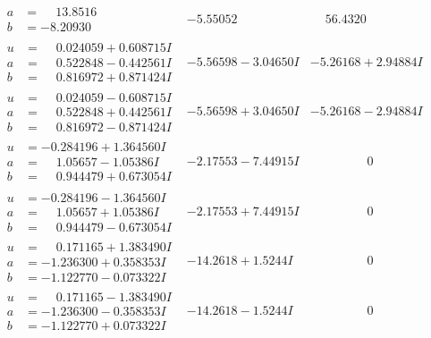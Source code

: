 \documentclass[1p]{elsarticle_modified}
\theoremstyle{definition}
\begin{document}
$$\begin{array}{c|c|c}
\begin{aligned}
a &= \phantom{-}13.8516\phantom{ +0.000000I} \\
b &= -8.20930\phantom{ +0.000000I}\end{aligned}
 & -5.55052\phantom{ +0.000000I} & \phantom{-}56.4320\phantom{ +0.000000I} \\ \hline\begin{aligned}
u &= \phantom{-}0.024059 + 0.608715 I \\
a &= \phantom{-}0.522848 - 0.442561 I \\
b &= \phantom{-}0.816972 + 0.871424 I\end{aligned}
 & -5.56598 - 3.04650 I & -5.26168 + 2.94884 I \\ \hline\begin{aligned}
u &= \phantom{-}0.024059 - 0.608715 I \\
a &= \phantom{-}0.522848 + 0.442561 I \\
b &= \phantom{-}0.816972 - 0.871424 I\end{aligned}
 & -5.56598 + 3.04650 I & -5.26168 - 2.94884 I \\ \hline\begin{aligned}
u &= -0.284196 + 1.364560 I \\
a &= \phantom{-}1.05657 - 1.05386 I \\
b &= \phantom{-}0.944479 + 0.673054 I\end{aligned}
 & -2.17553 - 7.44915 I & \phantom{-0.000000 } 0 \\ \hline\begin{aligned}
u &= -0.284196 - 1.364560 I \\
a &= \phantom{-}1.05657 + 1.05386 I \\
b &= \phantom{-}0.944479 - 0.673054 I\end{aligned}
 & -2.17553 + 7.44915 I & \phantom{-0.000000 } 0 \\ \hline\begin{aligned}
u &= \phantom{-}0.171165 + 1.383490 I \\
a &= -1.236300 + 0.358353 I \\
b &= -1.122770 - 0.073322 I\end{aligned}
 & -14.2618 + 1.5244 I & \phantom{-0.000000 } 0 \\ \hline\begin{aligned}
u &= \phantom{-}0.171165 - 1.383490 I \\
a &= -1.236300 - 0.358353 I \\
b &= -1.122770 + 0.073322 I\end{aligned}
 & -14.2618 - 1.5244 I & \phantom{-0.000000 } 0 \\ \hline\begin{aligned}

\end{aligned}
\end{array}$$
\end{document}

